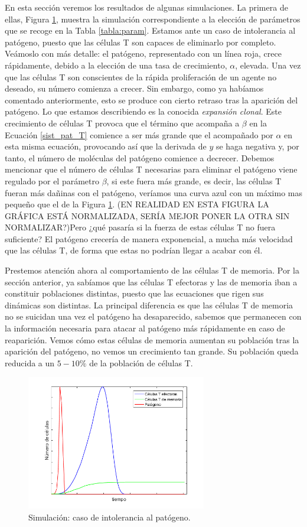 En esta sección  veremos los resultados de algunas simulaciones. La primera de ellas, Figura \ref{fig:intolerance}, muestra la simulación correspondiente a la elección de parámetros que se recoge en la Tabla \ref{tabla:param}. Estamos ante un caso de intolerancia al patógeno, puesto que las células T son capaces de eliminarlo por completo. 
Veámoslo con más detalle: el patógeno, representado con un línea roja, crece rápidamente, debido a la elección de una tasa de crecimiento, $\alpha$, elevada. Una vez que las células T son conscientes de la rápida proliferación de un agente no deseado, su número comienza a crecer. Sin embargo, como ya habíamos comentado anteriormente, esto se produce con cierto retraso tras la aparición del patógeno. Lo que estamos describiendo es la conocida \textit{expansión clonal}. Este crecimiento de células T provoca que el término que acompaña a $\beta$ en la Ecuación \ref{sist_pat_T} comience a ser más grande que el acompañado por $\alpha$ en esta misma ecuación, provocando así que la derivada de $y$ se haga negativa y, por tanto, el número de moléculas del patógeno comience a decrecer. Debemos mencionar que el número de células T necesarias para eliminar el patógeno viene regulado por el parámetro $\beta$, si este fuera más grande, es decir, las células T fueran más dañinas con el patógeno, veríamos una curva azul con un máximo mas pequeño que el de la Figura \ref{fig:intolerance}. (EN REALIDAD EN ESTA FIGURA LA GRÁFICA ESTÁ NORMALIZADA, SERÍA MEJOR PONER LA OTRA SIN NORMALIZAR?)Pero ¿qué pasaría si la fuerza de estas células T no fuera suficiente? El patógeno crecería de manera exponencial, a mucha más velocidad que las células T, de forma que estas no podrían llegar a acabar con él. 

Prestemos atención ahora al comportamiento de las células T de memoria. Por la sección anterior, ya sabíamos que las células T efectoras y las de memoria iban a constituir poblaciones distintas, puesto que las ecuaciones que rigen sus dinámicas son distintas. La principal diferencia es que las células T de memoria no se suicidan una vez el patógeno ha desaparecido, sabemos que permanecen con la información necesaria para atacar al patógeno más rápidamente en caso de reaparición. Vemos cómo estas células de memoria aumentan su población tras la aparición del patógeno, no vemos un crecimiento tan grande. Su población queda reducida a un $5-10\%$ de la población de células T.


\begin{figure}[t]
	\centering
	\includegraphics[width=0.7\textwidth]{Imagenes/Simulaciones/intolerance}
	\caption{Simulación: caso de intolerancia al patógeno.}
	\label{fig:intolerance}
\end{figure}
